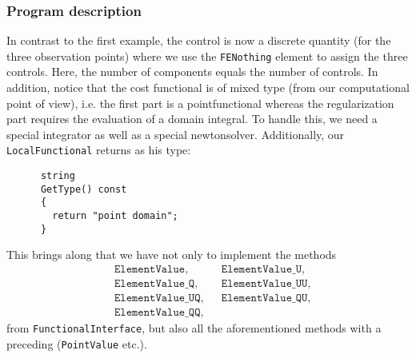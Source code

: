 \subsubsection{Program description}
{
In contrast to the first example, the control is now a discrete quantity (for
the three observation points) where we use the \texttt{FE\underline{}Nothing}
element to assign the three controls. Here, the number of components equals
the number of controls. 
In addition, }notice that the cost functional is of mixed type (from our computational point of view), i.e. the first part is a pointfunctional whereas the regularization part requires the evaluation of a domain integral. To handle this, we need a special integrator as well as a special newtonsolver. Additionally, our \texttt{LocalFunctional} returns as his type:
\begin{verbatim}
      string
      GetType() const
      {
        return "point domain";
      }
\end{verbatim}
This brings along that we have not only to implement {\color{red}the methods
\begin{align*} 
 &\texttt{ElementValue},&&
 \texttt{ElementValue\_U},\\
 &\texttt{ElementValue\_Q}, &&
 \texttt{ElementValue\_UU},\\
 &\texttt{ElementValue\_UQ},&&
 \texttt{ElementValue\_QU},\\
 &\texttt{ElementValue\_QQ},
\end{align*}}
 from \texttt{FunctionalInterface}, but also all the aforementioned methods with a preceding  (\texttt{PointValue} etc.).

